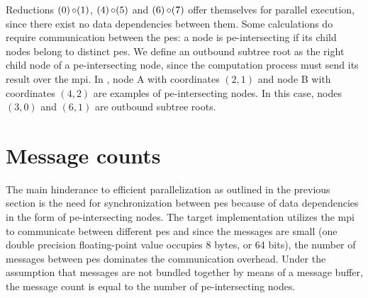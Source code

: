 Reductions $(0) \operatorname{\circ} (1)$, $(4) \operatorname{\circ} (5)$ and $(6) \operatorname{\circ} (7)$ offer themselves for parallel execution, since there exist no data dependencies between them.
Some calculations do require communication between the \glspl{pe}:
a node is \gls{pe}-intersecting if its child nodes belong to distinct \glspl{pe}.
We define an outbound subtree root as the right child node of a \gls{pe}-intersecting node, since the computation process must send its result over the \gls{mpi}.
In , node A with coordinates $(2,1)$ and node B with coordinates $(4,2)$ are examples of \gls{pe}-intersecting nodes.
In this case, nodes $(3,0)$ and $(6,1)$ are outbound subtree roots.

\section{Message counts}
\label{sec:MessageCounts}
The main hinderance to efficient parallelization as outlined in the previous section is the need for synchronization between \glspl{pe} because of data dependencies in the form of \gls{pe}-intersecting nodes.
The target implementation utilizes the \gls{mpi} to communicate between different \glspl{pe} and since the messages are small (one double precision floating-point value occupies 8 bytes, or 64 bits), the number of messages between \glspl{pe} dominates the communication overhead.
Under the assumption that messages are not bundled together by means of a message buffer, the message count is equal to the number of \gls{pe}-intersecting nodes.

